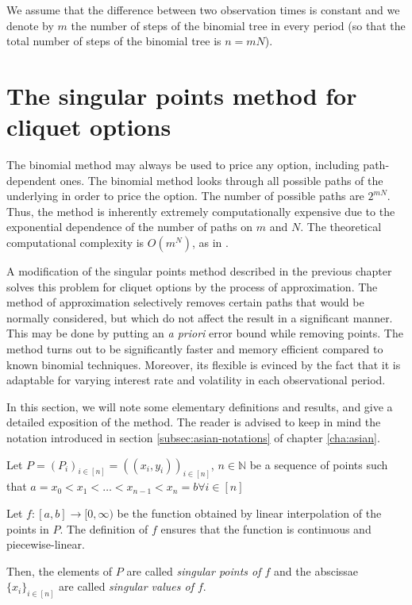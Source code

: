 We assume that the difference between two observation times is constant and we denote by $m$ the number of steps of the binomial tree in every period (so that the total number of steps of the binomial tree is $ n = m N $).



\section{The singular points method for cliquet options}
\label{sec:clq-sp}

The binomial method may always be used to price any option, including path-dependent ones. The binomial method looks through all possible paths of the underlying in order to price the option. The number of possible paths are $ 2 ^ {m N} $. Thus, the method is inherently extremely computationally expensive due to the exponential dependence of the number of paths on $m$ and $ N $. The theoretical computational complexity is $ O( m^{N} ) $, as in \cite[Page 128]{Gaudenzi2011}.

A modification of the singular points method described in the previous chapter solves this problem for cliquet options by the process of approximation. The method of approximation selectively removes certain paths that would be normally considered, but which do not affect the result in a significant manner. This may be done by putting an \emph{a priori} error bound while removing points. The method turns out to be significantly faster and memory efficient compared to known binomial techniques. Moreover, its flexible is evinced by the fact that it is adaptable for varying interest rate and volatility in each observational period.

In this section, we will note some elementary definitions and results, and give a detailed exposition of the method. The reader is advised to keep in mind the notation introduced in section \ref{subsec:asian-notations} of chapter \ref{cha:asian}.

\begin{dfn}
	\label{def:clq-sp}
	Let $ P = (P_i)_{i \in [n]} = ( (x_i, y_i) )_{i \in [n]} $, $ n \in \mathbb{N} $ be a sequence of points such that $ a = x_0 < x_1 < \dots < x_{n-1} < x_n = b \forall i \in [n] $
	
	Let $ f:[a,b] \to [0, \infty) $ be the function obtained by linear interpolation of the points in $P$. The definition of $f$ ensures that the function is continuous and piecewise-linear.
	
	Then, the elements of $P$ are called \emph{singular points of $f$} and the abscissae $ \{ x_i \}_{i \in [n]} $ are called \emph{singular values of $f$}.
\end{dfn}


